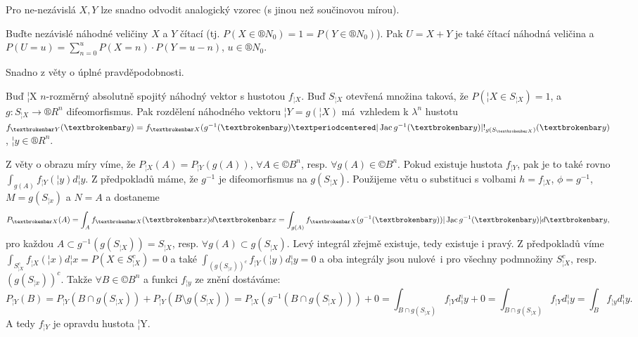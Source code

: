 \documentclass[12pt]{article}					%
\begin{document}
\begin{poznamka}
	Pro ne-nezávislá $X, Y$ lze snadno odvodit analogický vzorec (s jinou než součinovou mírou).
\end{poznamka}

\begin{veta}
	Buďte nezávislé náhodné veličiny $X$ a $Y$ čítací (tj. $P(X \in ®N_0) = 1 = P(Y \in ®N_0)$). Pak $U = X + Y$ je také čítací náhodná veličina a $P(U = u) = \sum_{n=0}^u P(X = n)·P(Y = u - n)$, $u \in ®N_0$.

	\begin{dukazin}
		Snadno z věty o úplné pravděpodobnosti.
	\end{dukazin}
\end{veta}

\begin{veta}
	Buď ¦X $n$-rozměrný absolutně spojitý náhodný vektor s hustotou $f_{¦X}$. Buď $S_{¦X}$ otevřená množina taková, že $P(¦X \in S_{¦X}) = 1$, a $g: S_{¦X} \rightarrow ®R^n$ difeomorfismus. Pak rozdělení náhodného vektoru $¦Y = g(¦X)$ má vzhledem k $\lambda^n$ hustotu $f_{¦Y}(¦y) = f_{¦X}(g^{-1}(¦y) · |\Jac g^{-1}(¦y)| !_{g(S_{¦X})}(¦y)$, $¦y \in ®R^n$.

	\begin{dukazin}
		Z věty o obrazu míry víme, že $P_{¦X}(A) = P_{¦Y}(g(A))$, $\forall A \in ©B^n$, resp. $\forall g(A) \in ©B^n$. Pokud existuje hustota $f_{¦Y}$, pak je to také rovno $\int_{g(A)} f_{¦Y}(¦y) d¦y$. Z předpokladů máme, že $g^{-1}$ je difeomorfismus na $g(S_{¦X})$. Použijeme větu o substituci s volbami $h = f_{¦X}$, $\phi = g^{-1}$, $M = g(S_{¦x})$ a $N = A$ a dostaneme
		$$ P_{¦X}(A) = \int_A f_{¦X}(¦x) d¦x = \int_{g(A)} f_{¦X}(g^{-1}(¦y)) |\Jac g^{-1}(¦y)| d¦y, $$
		pro každou $A \subset g^{-1}(g(S_{¦X})) = S_{¦X}$, resp. $\forall g(A) \subset g(S_{¦X})$. Levý integrál zřejmě existuje, tedy existuje i pravý. Z předpokladů víme $\int_{S_{¦X}^c} f_{¦X}(¦x) d¦x = P(X \in S_{¦X}^c) = 0$ a také $\int_{(g(S_{¦x}))^c} f_{¦Y}(¦y) d¦y = 0$ a oba integrály jsou nulové i pro všechny podmnožiny $S_{¦X}^c$, resp. $(g(S_{¦x}))^c$. Takže $\forall B \in ©B^n$ a funkci $f_{¦y}$ ze znění dostáváme:
		$$ P_{¦Y}(B) = P_{¦Y}(B \cap g(S_{¦X})) + P_{¦Y}(B \setminus g(S_{¦X})) = P_{¦X}(g^{-1}(B \cap g(S_{¦X}))) + 0 = \int_{B \cap g(S_{¦X})} f_{¦Y} d¦y + 0 = \int_{B \cap g(S_{¦X})} f_{¦Y} d¦y = \int_B f_{¦y} d¦y. $$
		A tedy $f_{¦Y}$ je opravdu hustota ¦Y.
	\end{dukazin}
\end{veta}
\end{document}
